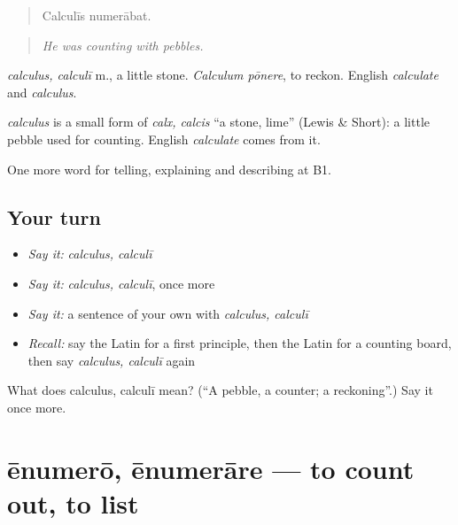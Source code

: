 \begin{quote}
Calculīs numerābat.
\end{quote}

\begin{quote}
\emph{He was counting with pebbles.}
\end{quote}

\emph{calculus, calculī} m., a little stone. \emph{Calculum pōnere}, to reckon. English \emph{calculate} and \emph{calculus}.

\begin{cousinweb}
\emph{calculus} is a small form of \emph{calx, calcis} \textquotedblleft{}a stone, lime\textquotedblright{} (Lewis \& Short): a little pebble used for counting. English \emph{calculate} comes from it.
\end{cousinweb}

\begin{grammarlens}[title={What you've built}]
One more word for telling, explaining and describing at B1.
\end{grammarlens}

\subsection*{Your turn}
\begin{itemize}
\raggedright
  \item \emph{Say it:} \emph{calculus, calculī}
  \item \emph{Say it:} \emph{calculus, calculī}, once more
  \item \emph{Say it:} a sentence of your own with \emph{calculus, calculī}
  \item \emph{Recall:} say the Latin for a first principle, then the Latin for a counting board, then say \emph{calculus, calculī} again
\end{itemize}

\begin{tcolorbox}[breakable,colback=teal!4,colframe=teal!35!black,title={Before you move on}]
What does calculus, calculī mean? (\textquotedblleft{}A pebble, a counter; a reckoning\textquotedblright{}.) Say it once more.
\end{tcolorbox}
\section[ēnumerō, ēnumerāre]{ēnumerō, ēnumerāre — to count out, to list}

\label{lesson:LA-C405-enumero}



